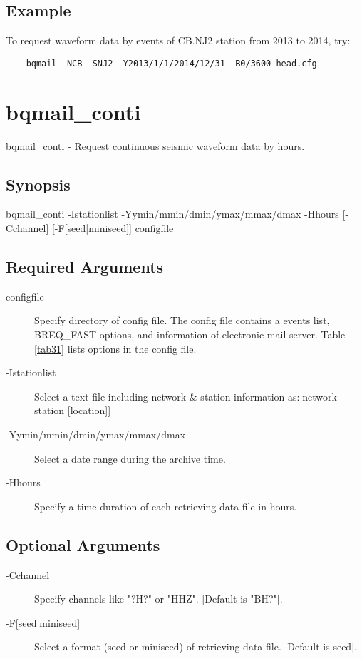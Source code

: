 \documentclass[12pt, a4paper]{report}
\begin{document}
\subsection{Example}
To request waveform data by events of CB.NJ2 station from 2013 to 2014, try:
\begin{lstlisting}
	bqmail -NCB -SNJ2 -Y2013/1/1/2014/12/31 -B0/3600 head.cfg
\end{lstlisting} 

\section{bqmail\_conti}
bqmail\_conti - Request continuous seismic waveform data by hours.
\subsection{Synopsis}
{\tb bqmail\_conti} {\tb -I}{\ti stationlist} {\tb -Y}{\ti ymin/mmin/dmin/ymax/mmax/dmax} {\tb -H}{\ti hours} [{\tb -C}{\ti channel}] [{\tb -F[{\ti seed}|{\ti miniseed}]}] {\ti configfile}
\subsection{Required Arguments}
\begin{description}
\item[{\ti configfile}] Specify directory of config file. The config file contains a events list, BREQ\_FAST options, and information of electronic mail server. Table \ref{tab31} lists options in the config file.
\item[{\tb -I}{\ti stationlist}] Select a text file including network \& station information as:[{\ti network station [location]}]
\item[{\tb -Y}{\ti ymin/mmin/dmin/ymax/mmax/dmax}] Select a date range during the archive time.
\item[{\tb -H}{\ti hours}] Specify a time duration of each retrieving data file in hours.
\end{description}
\subsection{Optional Arguments}
\begin{description}
\item[{\tb -C}{\ti channel}] Specify channels like "{\ti ?H?}" or "{\ti HHZ}". [Default is "{\ti BH?}"]. 
\item[{\tb -F[{\ti seed}|{\ti miniseed}]}] Select a format (seed or miniseed) of retrieving data file. [Default is {\ti seed}].
\end{description}
\end{document}

